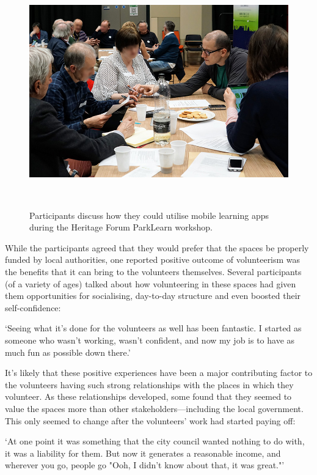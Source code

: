\begin{figure}
  \centering
  \includegraphics[width=0.9\columnwidth]{images/chapter06/HF_Workshop.jpg}
  \caption[The Heritage Forum ParkLearn workshop]{Participants discuss how they could utilise mobile learning apps during the Heritage Forum ParkLearn workshop.}~\label{fig:ParkLearnWorkshop}
\end{figure}

While the participants agreed that they would prefer that the spaces be properly funded by local authorities, one reported positive outcome of volunteerism was the benefits that it can bring to the volunteers themselves. Several participants (of a variety of ages) talked about how volunteering in these spaces had given them opportunities for socialising, day-to-day structure and even boosted their self-confidence:

\begin{displayquote}
`Seeing what it's done for the volunteers as well has been fantastic. I started as someone who wasn't working, wasn't confident, and now my job is to have as much fun as possible down there.' 
\end{displayquote}

It's likely that these positive experiences have been a major contributing factor to the volunteers having such strong relationships with the places in which they volunteer. As these relationships developed, some found that they seemed to value the spaces more than other stakeholders---including the local government. This only seemed to change after the volunteers' work had started paying off:

\begin{displayquote}
`At one point it was something that the city council wanted nothing to do with, it was a liability for them. But now it generates a reasonable income, and wherever you go, people go "Ooh, I didn't know about that, it was great."' 
\end{displayquote}

